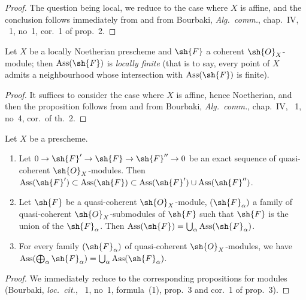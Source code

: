 \begin{proof}
The question being local, we reduce to the case where $X$ is affine, and the conclusion follows immediately from  and from Bourbaki, \emph{Alg.\ comm.}, chap.~IV, \textsection~1, no~1, cor.~1 of prop.~2.
\end{proof}

\begin{proposition}[3.1.6]
\label{IV.3.1.6}
Let $X$ be a locally Noetherian prescheme and $\sh{F}$ a coherent $\sh{O}_X$-module; then $\operatorname{Ass}(\sh{F})$ is \emph{locally finite} (that is to say, every point of $X$ admits a neighbourhood whose intersection with $\operatorname{Ass}(\sh{F})$ is finite).
\end{proposition}

\begin{proof}
It suffices to consider the case where $X$ is affine, hence Noetherian, and then the proposition follows from  and from Bourbaki, \emph{Alg.\ comm.}, chap.~IV, \textsection~1, no~4, cor.\ of th.~2.
\end{proof}

\begin{proposition}[3.1.7]
\label{IV.3.1.7}
Let $X$ be a prescheme.
\begin{enumerate}
  \item[(i)] Let $0\to\sh{F}'\to\sh{F}\to\sh{F}''\to 0$ be an exact sequence of quasi-coherent $\sh{O}_X$-modules.
  Then $\operatorname{Ass}(\sh{F}')\subset\operatorname{Ass}(\sh{F})\subset\operatorname{Ass}(\sh{F}')\cup\operatorname{Ass}(\sh{F}'')$.
  \item[(ii)] Let $\sh{F}$ be a quasi-coherent $\sh{O}_X$-module, $(\sh{F}_\alpha)$ a family of quasi-coherent $\sh{O}_X$-submodules of $\sh{F}$ such that $\sh{F}$ is the union of the $\sh{F}_\alpha$.
  Then $\operatorname{Ass}(\sh{F})=\bigcup_\alpha\operatorname{Ass}(\sh{F}_\alpha)$.
  \item[(iii)] For every family $(\sh{F}_\alpha)$ of quasi-coherent $\sh{O}_X$-modules, we have $\operatorname{Ass}(\bigoplus_\alpha\sh{F}_\alpha)=\bigcup_\alpha\operatorname{Ass}(\sh{F}_\alpha)$.
\end{enumerate}
\end{proposition}

\begin{proof}
We immediately reduce to the corresponding propositions for modules (Bourbaki, \emph{loc.\ cit.}, \textsection~1, no~1, formula~(1), prop.~3 and cor.~1 of prop.~3).
\end{proof}

